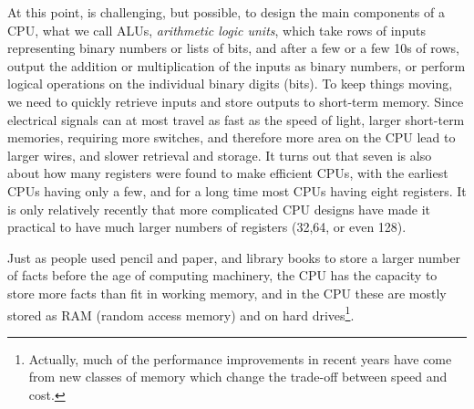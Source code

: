 \documentclass[12pt]{amsbook}
\begin{document}
{\medskip
At this point, is challenging, but possible, to design the main components of a CPU,
what we call ALUs, \emph{arithmetic logic units},
which take rows of inputs representing binary numbers or lists of bits, and after a few or a few 10s of rows, output the addition or multiplication of the inputs as binary numbers, or perform logical operations on the individual binary digits (bits).
To keep things moving, we need to quickly retrieve inputs and store outputs to short-term memory.
Since electrical signals can at most travel as fast as the speed of light,
larger short-term memories, requiring more switches, and therefore more area on the CPU lead to larger wires, and slower retrieval and storage.
It turns out that seven is also about how many registers were found to make efficient CPUs, with the earliest CPUs having only a few, and for a long time most CPUs having eight registers.
It is only relatively recently that more complicated CPU designs have made it practical to have much larger numbers of registers (32,64, or even 128).

Just as people used pencil and paper, and library books to store a larger number of facts before the age of computing machinery,
the CPU has the capacity to store more facts than fit in working memory, 
and in the CPU these are mostly stored as RAM (random access memory) and on hard drives\footnote{Actually, much of the performance improvements in recent years have come from new classes of memory which change the trade-off between speed and cost.}.

}
\end{document}
